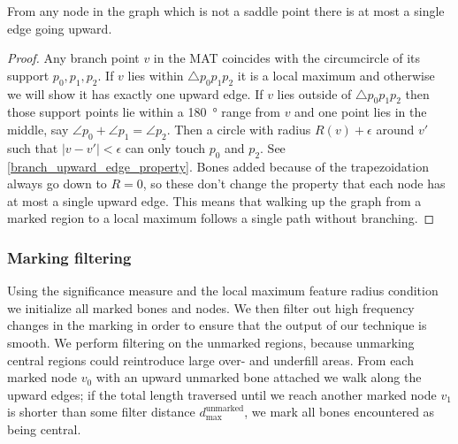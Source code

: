 \begin{lemma}\label{single_upward_edge}
From any node in the graph which is not a saddle point there is at most a single edge going upward.
\end{lemma}
\begin{proof}
Any branch point $v$ in the MAT coincides with the circumcircle of its support $p_0, p_1, p_2$.
If $v$ lies within $\triangle p_0 p_1 p_2$ it is a local maximum and otherwise we will show it has exactly one upward edge.
If $v$ lies outside of $\triangle p_0 p_1 p_2$ then those support points lie within a \SI{180}{\degree} range from $v$
and one point lies in the middle, say $\angle p_0 + \angle p_1 = \angle p_2$.
Then a circle with radius $R(v) + \epsilon$ around $v'$ such that $|v-v'| < \epsilon$ can only touch $p_0$ and $p_2$.
See \cref{branch_upward_edge_property}.
Bones added because of the trapezoidation always go down to $R=0$, so these don't change the property that each node has at most a single upward edge.
This means that walking up the graph from a marked region to a local maximum follows a single path without branching.
\end{proof}

\fi

\subsubsection{Marking filtering}
Using the significance measure and the local maximum feature radius condition we initialize all marked bones and nodes.
We then filter out high frequency changes in the marking in order to ensure that the output of our technique is smooth. 
We perform filtering on the unmarked regions, because unmarking central regions could reintroduce large over- and underfill areas.
From each marked node $v_0$ with an upward unmarked bone attached we walk along the upward edges;
if the total length traversed until we reach another marked node $v_1$ is shorter than some filter distance $d_\text{max}^\text{unmarked}$, we mark all bones encountered as being central.




